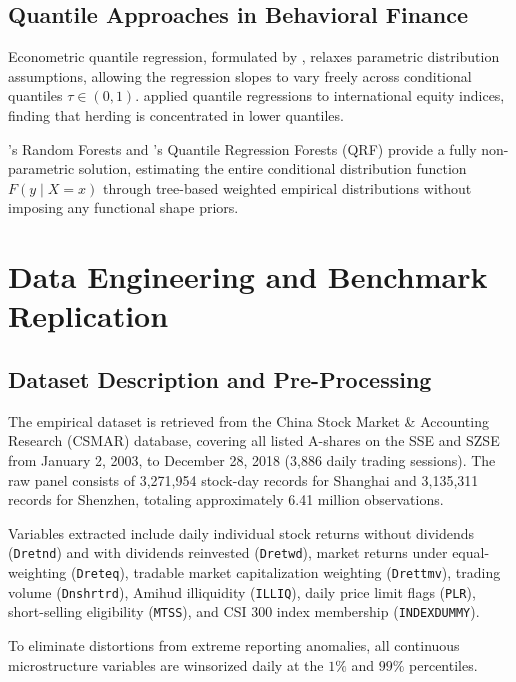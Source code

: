 \documentclass[12pt, a4paper]{article}
\begin{document}
\subsection{Quantile Approaches in Behavioral Finance}

Econometric quantile regression, formulated by \citet{Koenker1978}, relaxes parametric distribution assumptions, allowing the regression slopes to vary freely across conditional quantiles $\tau \in (0, 1)$. \citet{Chiang2010} applied quantile regressions to international equity indices, finding that herding is concentrated in lower quantiles.

\citet{Breiman2001}'s Random Forests and \citet{Meinshausen2006}'s Quantile Regression Forests (QRF) provide a fully non-parametric solution, estimating the entire conditional distribution function $F(y \mid X=x)$ through tree-based weighted empirical distributions without imposing any functional shape priors.

\section{Data Engineering and Benchmark Replication}

\subsection{Dataset Description and Pre-Processing}

The empirical dataset is retrieved from the China Stock Market \& Accounting Research (CSMAR) database, covering all listed A-shares on the SSE and SZSE from January 2, 2003, to December 28, 2018 (3,886 daily trading sessions). The raw panel consists of 3,271,954 stock-day records for Shanghai and 3,135,311 records for Shenzhen, totaling approximately 6.41 million observations.

Variables extracted include daily individual stock returns without dividends (\texttt{Dretnd}) and with dividends reinvested (\texttt{Dretwd}), market returns under equal-weighting (\texttt{Dreteq}), tradable market capitalization weighting (\texttt{Drettmv}), trading volume (\texttt{Dnshrtrd}), Amihud illiquidity (\texttt{ILLIQ}), daily price limit flags (\texttt{PLR}), short-selling eligibility (\texttt{MTSS}), and CSI 300 index membership (\texttt{INDEXDUMMY}).

To eliminate distortions from extreme reporting anomalies, all continuous microstructure variables are winsorized daily at the $1\%$ and $99\%$ percentiles.
\end{document}
